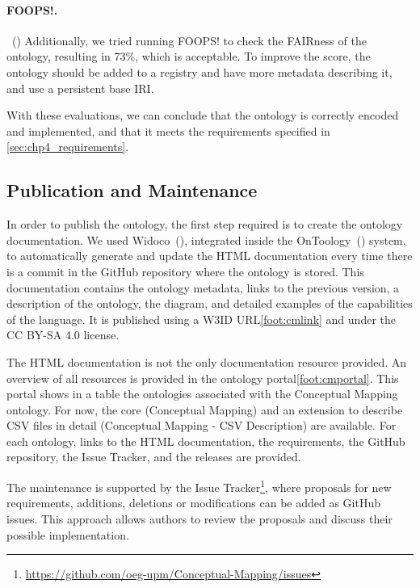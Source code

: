 \noindent\paragraph{\textbf{FOOPS!.}}~(\cite{garijo2021foops}) Additionally, we tried running FOOPS! to check the FAIRness of the ontology, resulting in 73\%, which is acceptable. To improve the score, the ontology should be added to a registry and have more metadata describing it, and use a persistent base IRI. 

With these evaluations, we can conclude that the ontology is correctly encoded and implemented, and that it meets the requirements specified in \cref{sec:chp4_requirements}. 



\subsection{Publication and Maintenance}
\label{sec:chp4_pub-main}

In order to publish the ontology, the first step required is to create the ontology documentation. We used Widoco~(\cite{garijo2017widoco}), integrated inside the OnToology~(\cite{alobaid2019automating}) system, to automatically generate and update the HTML documentation every time there is a commit in the GitHub repository where the ontology is stored. This documentation contains the ontology metadata, links to the previous version, a description of the ontology, the diagram, and detailed examples of the capabilities of the language. It is published using a W3ID URL\cref{foot:cmlink} and under the CC BY-SA 4.0 license.

The HTML documentation is not the only documentation resource provided. An overview of all resources is provided in the ontology portal\cref{foot:cmportal}. This portal shows in a table the ontologies associated with the Conceptual Mapping ontology. For now, the core (Conceptual Mapping) and an extension to describe CSV files in detail (Conceptual Mapping - CSV Description) are available. For each ontology, links to the HTML documentation, the requirements, the GitHub repository, the Issue Tracker, and the releases are provided. 

The maintenance is supported by the Issue Tracker\footnote{\url{https://github.com/oeg-upm/Conceptual-Mapping/issues}}, where proposals for new requirements, additions, deletions or modifications can be added as GitHub issues. This approach allows authors to review the proposals and discuss their possible implementation.




